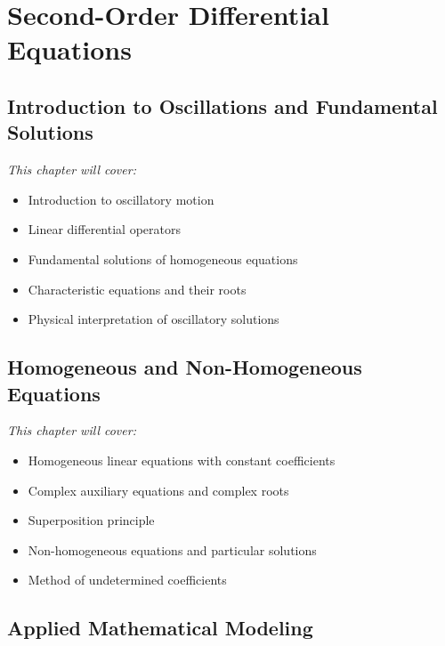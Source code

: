 \documentclass[12pt, letterpaper]{book}
\theoremstyle{problemstyle}
\theoremstyle{solutionstyle}
\begin{document}
\part{Second-Order Differential Equations}
\label{part:second_order_de}

\chapter{Introduction to Oscillations and Fundamental Solutions}
\label{chap:session_5}

\textit{This chapter will cover:}
\begin{itemize}
    \item Introduction to oscillatory motion
    \item Linear differential operators
    \item Fundamental solutions of homogeneous equations
    \item Characteristic equations and their roots
    \item Physical interpretation of oscillatory solutions
\end{itemize}

\chapter{Homogeneous and Non-Homogeneous Equations}
\label{chap:session_6}

\textit{This chapter will cover:}
\begin{itemize}
    \item Homogeneous linear equations with constant coefficients
    \item Complex auxiliary equations and complex roots
    \item Superposition principle
    \item Non-homogeneous equations and particular solutions
    \item Method of undetermined coefficients
\end{itemize}

\chapter{Applied Mathematical Modeling}
\label{chap:session_7}
\end{document}
